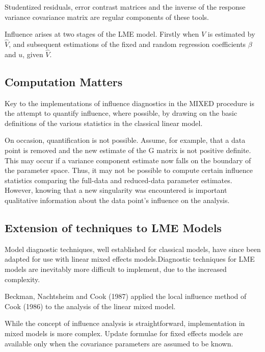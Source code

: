 \documentclass[Main.tex]{subfiles}
\begin{document}
		Studentized residuals, error contrast matrices and the inverse of the response variance covariance matrix are regular components of these tools.
		
		Influence arises at two stages of the LME model. Firstly when $V$ is estimated by $\hat{V}$, and subsequent
		estimations of the fixed and random regression coefficients $\beta$ and $u$, given $\hat{V}$.
		
		
	
		
				\subsection{Computation Matters}
				Key to the implementations of influence diagnostics in the MIXED procedure is the attempt to quantify influence, where possible, by drawing on the basic definitions of the various statistics in the classical linear	model. 
				
				On occasion, quantification is not possible. Assume, for example, that a data point is removed
				and the new estimate of the G matrix is not positive definite. This may occur if a variance component estimate now falls on the boundary of the parameter space. Thus, it may not be possible to compute certain influence statistics comparing the full-data and reduced-data parameter estimates. However, knowing that a new singularity was encountered is important qualitative information about the data point’s influence on	the analysis.
		\newpage
		\subsection{Extension of techniques to LME Models} %
		
		Model diagnostic techniques, well established for classical models, have since been adapted for use with linear mixed effects models.Diagnostic techniques for LME models are inevitably more difficult to implement, due to the increased complexity.
		
		Beckman, Nachtsheim and Cook (1987) \citet{Beckman} applied the local influence method of Cook (1986) to the analysis of the linear mixed model.
		
		While the concept of influence analysis is straightforward, implementation in mixed models is more complex. Update formulae for fixed effects models are available only when the covariance parameters are assumed to be known.
		
\end{document}
